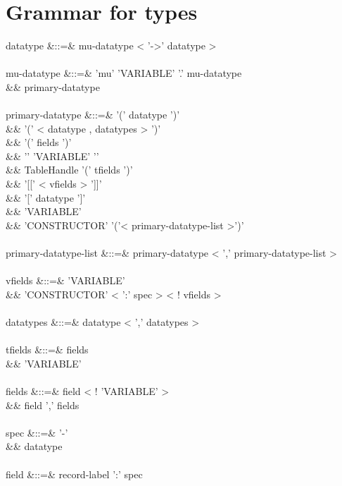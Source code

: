 \documentclass[11pt,a4paper]{article}
\begin{document}
\section{Grammar for types}

\begin{grammar}
datatype &::=& mu-datatype < '->' datatype > \\
\\
mu-datatype &::=& 'mu' 'VARIABLE' '.' mu-datatype \\
&&                primary-datatype \\
\\
primary-datatype &::=& '(' datatype ')' \\
&&                     '(' < datatype , datatypes > ')' \\
&&                     '(' fields ')' \\
&&                     '{' 'VARIABLE' '}' \\
&&                     TableHandle '(' tfields ')' \\
&&                     '[[' < vfields > ']]' \\
&&                     '[' datatype ']' \\
&&                     'VARIABLE' \\
&&                     'CONSTRUCTOR' '('< primary-datatype-list >')' \\
\\
primary-datatype-list &::=& primary-datatype < ',' primary-datatype-list > \\
\\
vfields &::=&  'VARIABLE'  \\
&&             'CONSTRUCTOR' < ':' spec >  < ! vfields > \\
\\
datatypes &::=& datatype < ',' datatypes > \\
\\
tfields &::=& fields \\
&&            'VARIABLE' \\
\\
fields &::=&  field < ! 'VARIABLE' >  \\
&&            field ',' fields \\
\\
spec &::=& '-' \\
&&         datatype \\
\\
field &::=& record-label ':' spec \\
\end{grammar}
\end{document}
